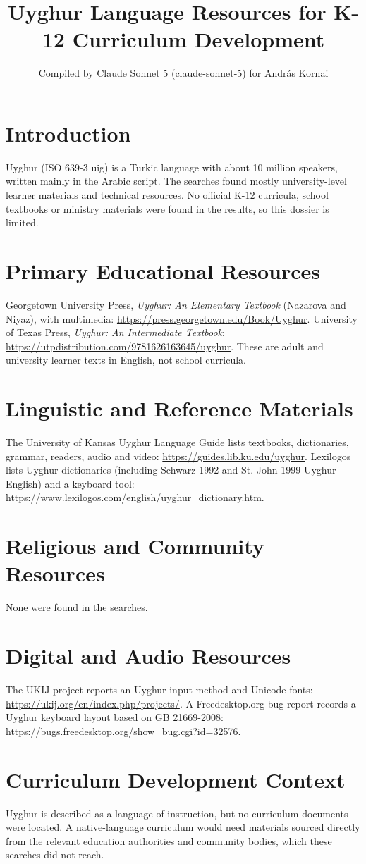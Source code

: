 \documentclass[12pt]{article}
\title{Uyghur Language Resources for K-12 Curriculum Development}
\author{Compiled by Claude Sonnet 5 (claude-sonnet-5) for Andr\'as Kornai}
\date{}
\begin{document}
\maketitle

\section{Introduction}
Uyghur (ISO 639-3 uig) is a Turkic language with about 10 million speakers, written mainly in the Arabic script. The searches found mostly university-level learner materials and technical resources. No official K-12 curricula, school textbooks or ministry materials were found in the results, so this dossier is limited.

\section{Primary Educational Resources}
Georgetown University Press, \emph{Uyghur: An Elementary Textbook} (Nazarova and Niyaz), with multimedia: \url{https://press.georgetown.edu/Book/Uyghur}. University of Texas Press, \emph{Uyghur: An Intermediate Textbook}: \url{https://utpdistribution.com/9781626163645/uyghur}. These are adult and university learner texts in English, not school curricula.

\section{Linguistic and Reference Materials}
The University of Kansas Uyghur Language Guide lists textbooks, dictionaries, grammar, readers, audio and video: \url{https://guides.lib.ku.edu/uyghur}. Lexilogos lists Uyghur dictionaries (including Schwarz 1992 and St. John 1999 Uyghur-English) and a keyboard tool: \url{https://www.lexilogos.com/english/uyghur_dictionary.htm}.

\section{Religious and Community Resources}
None were found in the searches.

\section{Digital and Audio Resources}
The UKIJ project reports an Uyghur input method and Unicode fonts: \url{https://ukij.org/en/index.php/projects/}. A Freedesktop.org bug report records a Uyghur keyboard layout based on GB 21669-2008: \url{https://bugs.freedesktop.org/show_bug.cgi?id=32576}.

\section{Curriculum Development Context}
Uyghur is described as a language of instruction, but no curriculum documents were located. A native-language curriculum would need materials sourced directly from the relevant education authorities and community bodies, which these searches did not reach.
\end{document}

